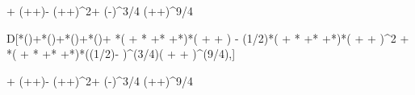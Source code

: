 \log  {}+  (++)-  (++){}^2+ \left(-\right)^{3/4}  (++){}^{9/4}

D[*\log ()+*\log ()+*\log ()+*\log ()+ *( + * +* +*)*( +  + ) - (1/2)*( + * +* +*)*( +  + ){}^{\wedge}2 + *( + * +* +*)*((1/2)- ){}^{\wedge}(3/4)( +  + ){}^{\wedge}(9/4),]

\log  {}+  (++)-  (++){}^2+ \left(-\right)^{3/4}  (++){}^{9/4}
